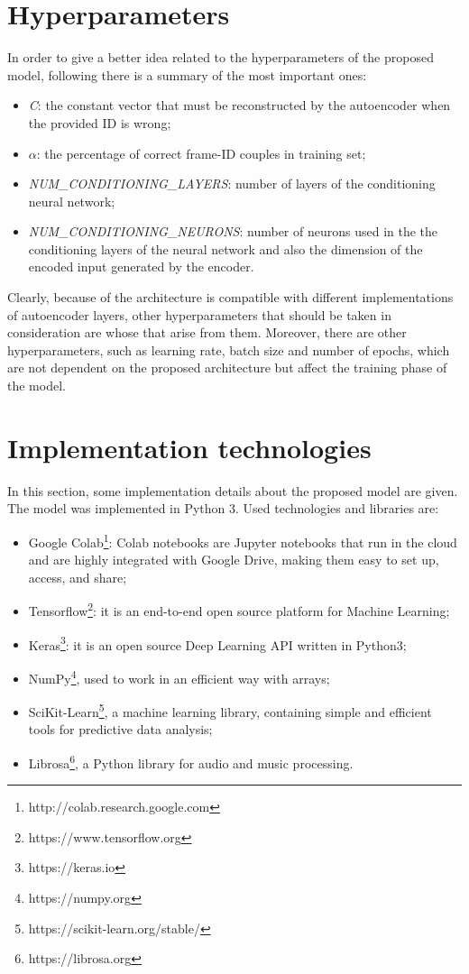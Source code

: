 \section{Hyperparameters}
In order to give a better idea related to the hyperparameters of the proposed model, following there is a summary of the most important ones:
\begin{itemize}
    \item {\textit{C}: the constant vector that must be reconstructed by the autoencoder when the provided ID is wrong;}
    \item {$\alpha$: the percentage of correct frame-ID couples in training set;}
    \item {\textit{NUM\_CONDITIONING\_LAYERS}: number of layers of the conditioning neural network;}
    \item {\textit{NUM\_CONDITIONING\_NEURONS}: number of neurons used in the the conditioning layers of the neural network and also the dimension of the encoded input generated by the encoder.}
\end{itemize}
Clearly, because of the architecture is compatible with different implementations of autoencoder layers, other hyperparameters that should be taken in consideration are whose that arise from them. Moreover, there are other hyperparameters, such as learning rate, batch size and number of epochs, which are not dependent on the proposed architecture but affect the training phase of the model.
\section{Implementation technologies}
In this section, some implementation details about the proposed model are given. The model was implemented in Python 3. Used technologies and libraries are:
\begin{itemize}
    \item {Google Colab\footnote{http://colab.research.google.com}: Colab notebooks are Jupyter notebooks that run in the cloud and are highly integrated with Google Drive, making them easy to set up, access, and share;}
    \item {Tensorflow\footnote{https://www.tensorflow.org}: it is an end-to-end open source platform for Machine Learning;}
    \item {Keras\footnote{https://keras.io}: it is an open source Deep Learning API written in Python3;}
    \item {NumPy\footnote{https://numpy.org}, used to work in an efficient way with arrays;}
    \item {SciKit-Learn\footnote{https://scikit-learn.org/stable/}, a machine learning library, containing simple and efficient tools for predictive data analysis;}
    \item {Librosa\footnote{https://librosa.org}, a Python library for audio and music processing.}
\end{itemize}

